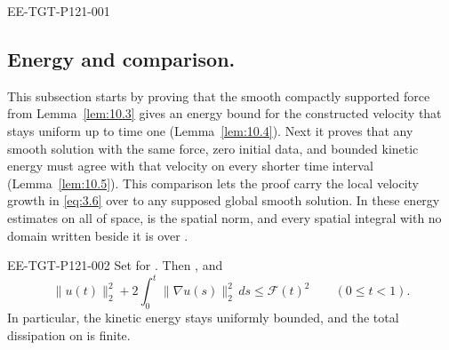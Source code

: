%
\begin{EESegment}{EE-TGT-P121-001}
\subsection{Energy and comparison.}\label{sec:10.3}
This subsection starts by proving that the smooth compactly supported force
 from Lemma~\ref{lem:10.3} gives an energy bound for the
constructed velocity  that stays uniform up to time one
(Lemma~\ref{lem:10.4}). Next it proves that any smooth solution with the same force,
zero initial data, and bounded kinetic energy must agree with that velocity on every
shorter time interval (Lemma~\ref{lem:10.5}). This comparison lets the proof carry the
local velocity growth in \eqref{eq:3.6} over to any supposed global smooth solution. In
these energy estimates on all of space,  is the spatial
 norm, and every spatial integral with no domain written
beside it is over .
\end{EESegment}

\begin{lemma}\label{lem:10.4}
\begin{EESegment}{EE-TGT-P121-002}
Set  for
. Then
, and
\begin{equation}
  \|u(t)\|_2^2+2\int_0^t\|\nabla u(s)\|_2^2\,ds
  \leq \mathcal F(t)^2
  \qquad (0\leq t<1).
\tag{10.13}\label{eq:10.13}
\end{equation}
In particular, the kinetic energy stays uniformly bounded, and the total dissipation on
\NSi{NS-F-P121-010}{[0,1)} is finite.
\end{EESegment}
\end{lemma}

